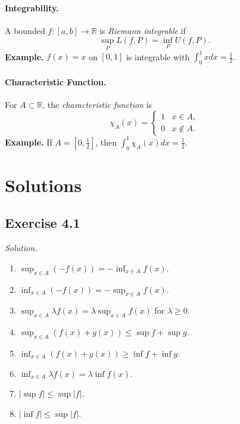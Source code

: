 \documentclass[11pt,a4paper]{article}
\newenvironment{solution}{\par\noindent\textit{Solution.}\ }{\par\vspace{0.5em}}
\begin{document}
\paragraph{Integrability.}
A bounded $f:[a,b]\to\mathbb{R}$ is \emph{Riemann integrable} if
\[
\sup_P L(f,P) = \inf_P U(f,P).
\]
\textbf{Example.} $f(x)=x$ on $[0,1]$ is integrable with $\int_0^1 x dx = \tfrac{1}{2}$.

\paragraph{Characteristic Function.}
For $A \subset \mathbb{R}$, the \emph{characteristic function} is
\[
\chi_A(x) = \begin{cases}
	1 & x \in A, \\
	0 & x \notin A.
\end{cases}
\]
\textbf{Example.} If $A=[0,\tfrac{1}{2}]$, then $\int_0^1 \chi_A(x) dx = \tfrac{1}{2}$.

\section*{Solutions}

\subsection*{Exercise 4.1}
\begin{solution}
	\begin{enumerate}[label=\alph*)]
		\item $\sup_{x\in A}(-f(x)) = -\inf_{x\in A} f(x)$.
		\item $\inf_{x\in A}(-f(x)) = -\sup_{x\in A} f(x)$.
		\item $\sup_{x\in A}\lambda f(x) = \lambda \sup_{x\in A} f(x)$ for $\lambda \geq 0$.
		\item $\sup_{x\in A}(f(x)+g(x)) \leq \sup f + \sup g$.
		\item $\inf_{x\in A}(f(x)+g(x)) \geq \inf f + \inf g$.
		\item $\inf_{x\in A}\lambda f(x) = \lambda \inf f(x)$.
		\item $|\sup f| \leq \sup |f|$.
		\item $|\inf f| \leq \sup |f|$.
	\end{enumerate}
\end{solution}
\end{document}
